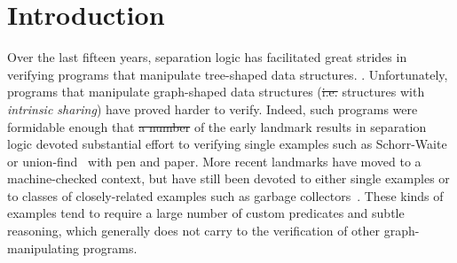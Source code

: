 \documentclass[acmsmall,screen]{acmart}  %
\providecommand{\DIFadd}[1]{{\protect\color{blue}\uwave{#1}}} %
\providecommand{\DIFdel}[1]{{\protect\color{red}\sout{#1}}}                      %
\providecommand{\DIFaddbegin}{} %
\providecommand{\DIFaddend}{} %
\providecommand{\DIFdelbegin}{} %
\providecommand{\DIFdelend}{} %
\newcommand{\DIFscaledelfig}{0.5}
\newlength{\DIFdelgraphicswidth} %
\newlength{\DIFdelgraphicsheight} %
\newcommand{\DIFaddincludegraphics}[2][]{{\color{blue}\fbox{\DIFOincludegraphics[#1]{#2}}}} %
\newcommand{\DIFdelincludegraphics}[2][]{%
\sbox{\DIFdelgraphicsbox}{\DIFOincludegraphics[#1]{#2}}%
\settoboxwidth{\DIFdelgraphicswidth}{\DIFdelgraphicsbox} %
\settoboxtotalheight{\DIFdelgraphicsheight}{\DIFdelgraphicsbox} %
\scalebox{\DIFscaledelfig}{%
\parbox[b]{\DIFdelgraphicswidth}{\usebox{\DIFdelgraphicsbox}\\[-\baselineskip] \rule{\DIFdelgraphicswidth}{0em}}\llap{\resizebox{\DIFdelgraphicswidth}{\DIFdelgraphicsheight}{%
\setlength{\unitlength}{\DIFdelgraphicswidth}%
\begin{picture}(1,1)%
\thicklines\linethickness{2pt} %
{\color[rgb]{1,0,0}\put(0,0){\framebox(1,1){}}}%
{\color[rgb]{1,0,0}\put(0,0){\line( 1,1){1}}}%
{\color[rgb]{1,0,0}\put(0,1){\line(1,-1){1}}}%
\end{picture}%
}\hspace*{3pt}}} %
} %
\DeclareRobustCommand{\DIFaddbegin}{\DIFOaddbegin \let\includegraphics\DIFaddincludegraphics} %
\DeclareRobustCommand{\DIFaddend}{\DIFOaddend \let\includegraphics\DIFOincludegraphics} %
\DeclareRobustCommand{\DIFdelbegin}{\DIFOdelbegin \let\includegraphics\DIFdelincludegraphics} %
\DeclareRobustCommand{\DIFdelend}{\DIFOaddend \let\includegraphics\DIFOincludegraphics} %
\begin{document}
\DIFdelbegin %
\DIFdelend \DIFaddbegin {}
\DIFaddend 




\DIFdelbegin %
\DIFdelend \DIFaddbegin {}  
\DIFaddend 


\maketitle

\section{Introduction}
\label{dummyref} \label{sec:intro}
Over the last fifteen years, separation logic has facilitated great strides
in verifying programs that manipulate tree-shaped data structures.
\citep{berdine:smallfoot,chin:hipsleek,jacobs:verifast,
chlipala:bedrock,bengtson:charge,appel:programlogics}.
Unfortunately, programs that manipulate graph-shaped data structures
(\DIFdelbegin \DIFdel{i.e. }\DIFdelend \DIFaddbegin \emph{\DIFadd{i.e.}} \DIFaddend structures with \emph{intrinsic sharing}) have proved harder to verify.
Indeed, such programs were formidable enough that \DIFdelbegin \DIFdel{a number }\DIFdelend \DIFaddbegin \DIFadd{many }\DIFaddend of the early
landmark results in separation logic devoted substantial effort to verifying
single examples such as Schorr-Waite~\cite{hongseok:phd} or
union-find~\cite{neelthesis} with pen and paper.
More recent landmarks have moved to a machine-checked context, but have still
been devoted to either single examples or to classes of closely-related examples
such as garbage collectors~\cite{gcexample3,cakemlgc}.
These kinds of examples tend to require a large number
of custom predicates and subtle reasoning, which generally
does not carry \DIFaddbegin \DIFadd{over
}\DIFaddend to the verification of other graph-manipulating programs.
\end{document}
